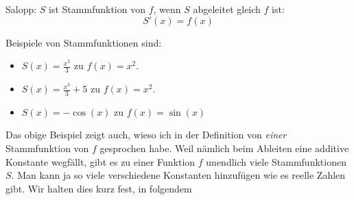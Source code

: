 \documentclass[%
<<<<<<< Updated upstream
11pt,%
twoside,%
titlepage,%
german,%
headsepline%
]{scrartcl}
\begin{document}
\begin{bem}
Salopp: $S$ ist Stammfunktion von $f$, wenn $S$ abgeleitet gleich $f$ ist:
$$S'(x)=f(x)$$
\end{bem}

\begin{bsps}
Beispiele von Stammfunktionen sind:
\begin{itemize}
\item $S(x)=\frac{x^3}{3}$ zu $f(x)=x^2$.
\item $S(x)=\frac{x^3}{3}+5$ zu $f(x)=x^2$.
\item $S(x)=-\cos(x)$ zu $f(x)=\sin(x)$
\end{itemize}
\end{bsps}

Das obige Beispiel zeigt auch, wieso ich in der Definition von \emph{einer} Stammfunktion von $f$ gesprochen habe. Weil nämlich beim Ableiten eine additive Konstante wegfällt, gibt es zu einer Funktion $f$ unendlich viele Stammfunktionen $S$. Man kann ja so viele verschiedene Konstanten hinzufügen wie es reelle Zahlen gibt. Wir halten dies kurz fest, in folgendem
\end{document}
